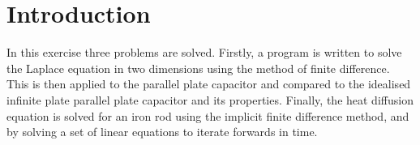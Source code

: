 \section{Introduction}
\label{sec:introduction}

In this exercise three problems are solved. Firstly, a program is written to solve the Laplace equation in two dimensions using the method of finite difference. This is then applied to the parallel plate capacitor and compared to the idealised infinite plate parallel plate capacitor and its properties. Finally, the heat diffusion equation is solved for an iron rod using the implicit finite difference method, and by solving a set of linear equations to iterate forwards in time.